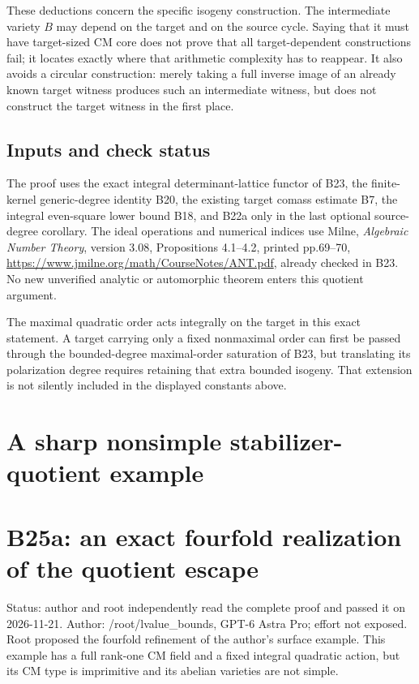 \documentclass[11pt,a4paper]{article}
\providecommand{\tightlist}{\setlength{\itemsep}{0pt}\setlength{\parskip}{0pt}}
\theoremstyle{definition}
\begin{document}
These deductions concern the specific isogeny construction. The intermediate variety \(B\) may depend on the target and on the source cycle. Saying that it must have target-sized CM core does not prove that all target-dependent constructions fail; it locates exactly where that arithmetic complexity has to reappear. It also avoids a circular construction: merely taking a full inverse image of an already known target witness produces such an intermediate witness, but does not construct the target witness in the first place.

\subsection{Inputs and check status}\label{inputs-and-check-status}

The proof uses the exact integral determinant-lattice functor of B23, the finite-kernel generic-degree identity B20, the existing target comass estimate B7, the integral even-square lower bound B18, and B22a only in the last optional source-degree corollary. The ideal operations and numerical indices use Milne, \emph{Algebraic Number Theory}, version 3.08, Propositions 4.1--4.2, printed pp.69--70, \url{https://www.jmilne.org/math/CourseNotes/ANT.pdf}, already checked in B23. No new unverified analytic or automorphic theorem enters this quotient argument.

The maximal quadratic order acts integrally on the target in this exact statement. A target carrying only a fixed nonmaximal order can first be passed through the bounded-degree maximal-order saturation of B23, but translating its polarization degree requires retaining that extra bounded isogeny. That extension is not silently included in the displayed constants above.

\section{A sharp nonsimple stabilizer-quotient example}

\providecommand{\tightlist}{\setlength{\itemsep}{0pt}\setlength{\parskip}{0pt}}
\section{B25a: an exact fourfold realization of the quotient escape}\label{b25a-an-exact-fourfold-realization-of-the-quotient-escape}

Status: author and root independently read the complete proof and passed it on 2026-11-21. Author: /root/lvalue\_bounds, GPT-6 Astra Pro; effort not exposed. Root proposed the fourfold refinement of the author's surface example. This example has a full rank-one CM field and a fixed integral quadratic action, but its CM type is imprimitive and its abelian varieties are not simple.
\end{document}
